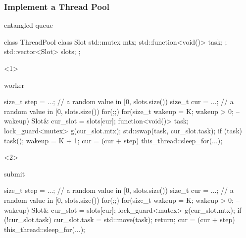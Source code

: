 \documentclass[UTF8,lualatex]{ctexbeamer}
\begin{document}
\begin{frame}[fragile,t]
    \frametitle{Implement a Thread Pool}
    \scriptsize
    \begin{exampleblock}{entangled queue}
        \tiny
        \begin{cppcode}
            class ThreadPool {
                class Slot {
                    std::mutex mtx;
                    std::function<void()> task;
                };
                std::vector<Slot> slots;
            };
        \end{cppcode}
    \end{exampleblock}
    \begin{onlyenv}<1>
        \begin{exampleblock}{worker}
            \tiny
            \begin{cppcode}
                size_t step = ...; // a random value in [0, slots.size())
                size_t cur = ...; // a random value in [0, slots.size())
                for(;;) {
                    for(size_t wakeup = K; wakeup > 0; --wakeup) {
                        Slot& cur_slot = slots[cur];
                        function<void()> task;
                        {
                            lock_guard<mutex> g(cur_slot.mtx);
                            std::swap(task, cur_slot.task);
                        }
                        if (task) {
                            task();
                            wakeup = K + 1;
                        }
                        cur = (cur + step) %
                    }
                    this_thread::sleep_for(...);
                }
            \end{cppcode}
        \end{exampleblock}
    \end{onlyenv}
    \begin{onlyenv}<2>
        \begin{exampleblock}{submit}
            \tiny
            \begin{cppcode}
                size_t step = ...; // a random value in [0, slots.size())
                size_t cur = ...; // a random value in [0, slots.size())
                for(;;) {
                    for(size_t wakeup = K; wakeup > 0; --wakeup) {
                        Slot& cur_slot = slots[cur];
                        {
                            lock_guard<mutex> g(cur_slot.mtx);
                            if (!cur_slot.task) {
                                cur_slot.task = std::move(task);
                                return;
                            }
                        }
                        cur = (cur + step) %
                    }
                    this_thread::sleep_for(...);
                }
            \end{cppcode}
        \end{exampleblock}
    \end{onlyenv}
\end{frame}
\end{document}
